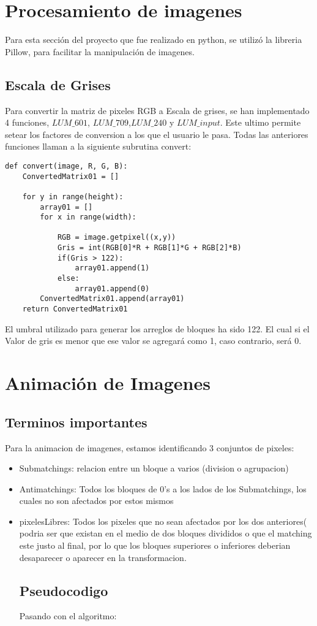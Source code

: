 \documentclass{article}
\begin{document}
\section{Procesamiento de imagenes}
Para esta sección del proyecto que fue realizado en python, se utilizó la libreria Pillow, para facilitar la manipulación de imagenes.

\subsection{Escala de Grises}
Para convertir la matriz de pixeles RGB a Escala de grises, se han implementado 4 funciones, $LUM\_601$, $LUM\_709$,$LUM\_240$ y $LUM\_input$. Este ultimo permite setear los factores de conversion a los que el usuario le pasa. Todas las anteriores funciones llaman a la siguiente subrutina convert:

\begin{lstlisting}
def convert(image, R, G, B):
    ConvertedMatrix01 = []

    for y in range(height):
        array01 = []
        for x in range(width):
        
            RGB = image.getpixel((x,y))
            Gris = int(RGB[0]*R + RGB[1]*G + RGB[2]*B)
            if(Gris > 122):
                array01.append(1)
            else:
                array01.append(0)
        ConvertedMatrix01.append(array01)
    return ConvertedMatrix01
\end{lstlisting}

El umbral utilizado para generar los arreglos de bloques ha sido 122. El cual si el Valor de gris es menor que ese valor se agregará como 1, caso contrario, será 0.

\section{Animación de Imagenes}
\subsection{Terminos importantes}
Para la animacion de imagenes, estamos identificando 3 conjuntos de pixeles:
\begin{itemize}
    \item Submatchings: relacion entre un bloque a varios (division o agrupacion)  
    \item Antimatchings: Todos los bloques de 0's a los lados de los Submatchings, los cuales no son afectados por estos mismos
    \item pixelesLibres: Todos los pixeles que no sean afectados por los dos anteriores( podria ser que existan en el medio de dos bloques divididos o que el matching este justo al final, por lo que los bloques superiores o inferiores deberian desaparecer o aparecer en la transformacion.

\subsection{Pseudocodigo}
    Pasando con el algoritmo:
\end{itemize}
\end{document}
